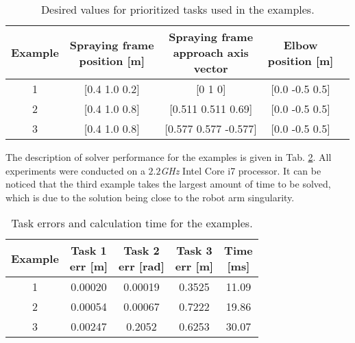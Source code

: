 \begin{table}[]
    \centering
    \begin{tabular}{c | c c c c}
         Example & \makecell{ Spraying frame \\ position [m] }  & \makecell{ Spraying frame \\ approach axis \\ vector } & \makecell{ Elbow \\ position [m]} \\
         \hline
         1 & [0.4 1.0 0.2] & [0 1 0] & [0.0 -0.5 0.5] \\
         2 & [0.4 1.0 0.8] & [0.511 0.511 0.69] & [0.0 -0.5 0.5] \\
         3 & [0.4 1.0 0.8] & [0.577 0.577 -0.577] & [0.0 -0.5 0.5]
    \end{tabular}
    \caption{Desired values for prioritized tasks used in the examples.}
    \label{tab:pik_examples}
\end{table}

The description of solver performance for the examples is given in Tab. \ref{tab:pik_results}. All experiments were conducted on a $2.2$\textit{GHz} Intel Core i7 processor. It can be noticed that the third example takes the largest amount of time to be solved, which is due to the solution being close to the robot arm singularity. %

\begin{table}[]
    \centering
    \begin{tabular}{c | c c c c}
         Example & \makecell{ Task 1 \\ err [m] }  & \makecell{ Task 2 \\ err [rad]} & \makecell{ Task 3 \\ err [m]} & \makecell{ Time \\ \textnormal{[ms]} } \\
         \hline
         1 & 0.00020 & 0.00019 & 0.3525 & 11.09 \\
         2 & 0.00054 & 0.00067 & 0.7222 & 19.86 \\
         3 & 0.00247 & 0.2052 & 0.6253 & 30.07 
    \end{tabular}
    \caption{Task errors and calculation time for the examples.}
    \label{tab:pik_results}
\end{table}

